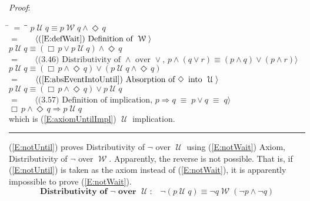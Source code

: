\documentclass[12pt, fleqn, leqno]{article}
\newcommand{\lgap}{2pt}                             %
\newcommand{\mymathindent}{24pt}                    %
\newcommand{\equivs}{\ensuremath{\;\equiv\;}}       %
\newcommand{\impl}{\ensuremath{\Rightarrow}}        %
\newcommand{\Until}{\;\mathcal{U}\;}
\newcommand{\Wait}{\;\mathcal{W}\;}
\newcommand{\Event}{\Diamond\,}
\newcommand{\Always}{\Box\,}
\newcommand{\myqed}{\rule[-.23ex]{1.2ex}{2.0ex}}
\newcommand{\myqedtab}{\hspace{384pt}}              %
\newcommand{\Gll} {\langle}                         %
\newcommand{\Ggg} {\rangle}                         %
\newcommand{\Hint}[1]     {\ \ \ $\Gll              \mbox{#1} \Ggg$ }   %
\begin{document}
\emph{Proof}:
\begin{tabbing}
\hspace{\mymathindent} \= $= \;$ \= \myqedtab \= \kill
\> \> $p \Until q \equiv p \Wait q\land \Event q$\\[\lgap]
\> $=$ \> \Hint{(\ref{E:defWait}) Definition of $\Wait$} \\[\lgap]
\> \> $p \Until q \equiv (\Always p\lor p \Until q)\land \Event q$\\[\lgap]
\> $=$ \> \Hint{(3.46) Distributivity of $\land$ over $\lor$, $p\land (q\lor r)\equiv (p\land q)\lor (p\land r)$} \\[\lgap]
\> \> $p \Until q \equiv (\Always p\land \Event q)\lor (p \Until q\land \Event q)$\\[\lgap]
\> $=$ \> \Hint{(\ref{E:absEventIntoUntil}) Absorption of $\Event$ into $\Until$} \\[\lgap]
\> \> $p \Until q \equiv (\Always p\land \Event q)\lor p \Until q$\\[\lgap]
\> $=$ \> \Hint{(3.57) Definition of implication, $p\impl q\equivs p\lor q \equivs q$} \\[\lgap]
\> \> $\Always p\land \Event q\impl p\Until q$\\[\lgap]
\> which is (\ref{E:axiomUntilImpl}) $\Until$ implication. \quad \myqed
\end{tabbing}

(\ref{E:notUntil}) proves Distributivity of $\neg$ over $\Until$ using (\ref{E:notWait}) Axiom, Distributivity of $\neg$ over $\Wait$.
Apparently, the reverse is not possible.
That is, if (\ref{E:notUntil}) is taken as the axiom instead of (\ref{E:notWait}), it is apparently impossible to prove (\ref{E:notWait}).
\begin{equation}\label{E:notUntil}
\textbf{Distributivity of $\neg$ over $\Until$:}\quad \neg (p \Until q) \equiv \neg q \Wait (\neg p \land \neg q)
\end{equation}
\end{document}
